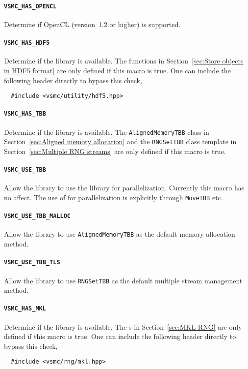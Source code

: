 \paragraph{\texttt{VSMC\_HAS\_OPENCL}} Determine if OpenCL (version~1.2 or
higher) is supported.

\paragraph{\texttt{VSMC\_HAS\_HDF5}} Determine if the \hdf library is
available. The functions in Section~\ref{sec:Store objects in HDF5 format} are
only defined if this macro is true. One can include the following header
directly to bypass this check,
\begin{Verbatim}
  #include <vsmc/utility/hdf5.hpp>
\end{Verbatim}

\paragraph{\texttt{VSMC\_HAS\_TBB}} Determine if the \tbb library is available.
The \verb|AlignedMemoryTBB| class in Section~\ref{sec:Aligned memory
  allocation} and the \verb|RNGSetTBB| class template in
Section~\ref{sec:Multiple RNG streams} are only defined if this macro is true.

\paragraph{\texttt{VSMC\_USE\_TBB}} Allow the library to use the \tbb library
for parallelization. Currently this macro has no affect. The use of \tbb for
parallelization is explicitly through \verb|MoveTBB| etc.

\paragraph{\texttt{VSMC\_USE\_TBB\_MALLOC}} Allow the library to use
\verb|AlignedMemoryTBB| as the default memory allocation method.

\paragraph{\texttt{VSMC\_USE\_TBB\_TLS}} Allow the library to use
\verb|RNGSetTBB| as the default multiple \rng stream management method.

\paragraph{\texttt{VSMC\_HAS\_MKL}} Determine if the \mkl library is available.
The \rng{}s in Section~\ref{sec:MKL RNG} are only defined if this macro is
true. One can include the following header directly to bypass this check,
\begin{Verbatim}
  #include <vsmc/rng/mkl.hpp>
\end{Verbatim}

